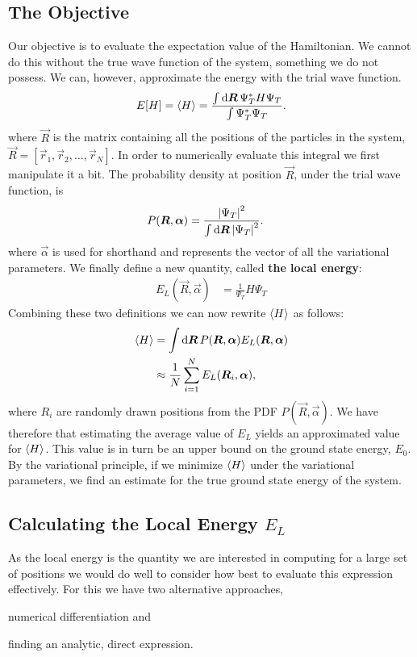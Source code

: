 \documentclass[twocolumn]{article}
\begin{document}
\subsection{The Objective}
Our objective is to evaluate the expectation value of the Hamiltonian. We cannot do this
without the true wave function of the system, something we do not possess.
We can, however, approximate the energy with the trial wave function.
\begin{align}
    E[H] = \expval{H} = \frac{\int \dd{\bm R} \Psi^*_T H \Psi_T}{\int
    \Psi_T^*\Psi_T}.
\end{align}
where $\vec R$ is the matrix containing all the positions of the particles in
the system, $\vec R = [\vec r_1, \vec r_2, \dots, \vec r_N]$.
In order to numerically evaluate this integral we first manipulate it a bit.
The probability density at position $\vec R$, under the trial wave function, is
\begin{align}
    P(\bm R, \bm \alpha) &= \frac{\abs{\Psi_T}^2}{\int \dd{\bm R}\abs{\Psi_T}^2}.
\end{align}
where $\vec \alpha$ is used for shorthand and represents the vector of all the variational parameters.
We finally define a new quantity, called \textbf{the local energy}:
\begin{align}
    E_L(\vec R, \vec \alpha) &= \frac{1}{\Psi_T}H\Psi_T\label{eq:E_L}
\end{align}
Combining these two definitions we can now rewrite $\expval{H}$ as follows:
\begin{align}
    \begin{split}
        \expval{H} &= \int \dd{\bm R} P(\bm R,\bm\alpha) E_L(\bm R,\bm\alpha)\\
        &\approx
        \frac{1}{N}\sum_{i=1}^N E_L(\bm R_i,\bm\alpha),
    \end{split}\label{eq:the-objective}
\end{align}
where $R_i$ are randomly drawn positions from the PDF $P(\vec R, \vec\alpha)$.
We have therefore that estimating the average value of $E_L$ yields an
approximated value for $\expval{H}$. This value is in turn be an upper bound on the
ground state energy, $E_0$. By the variational principle, if we minimize
$\expval{H}$ under the variational parameters, we find an estimate for the true
ground state energy of the system.

\subsection{Calculating the Local Energy $E_L$}
As the local energy is the quantity we are interested in computing for a
large set of positions we would do well to consider how best to evaluate this
expression effectively. For this we have two alternative approaches,
\begin{inparaenum}[1)]
    \item numerical differentiation and
    \item finding an analytic, direct expression.
\end{inparaenum}
\end{document}
